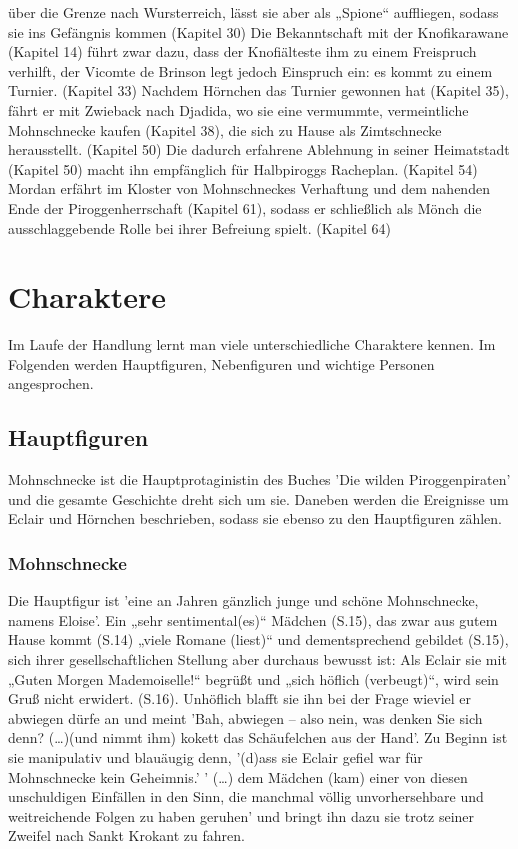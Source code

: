 über die Grenze nach Wursterreich, lässt sie aber als „Spione“ auffliegen, sodass sie ins Gefängnis kommen (Kapitel 30) 
Die Bekanntschaft mit der Knofikarawane (Kapitel 14) führt zwar dazu, dass der Knofiälteste ihm zu einem Freispruch 
verhilft, der Vicomte de Brinson legt jedoch Einspruch ein: es kommt zu einem Turnier. (Kapitel 33) 
Nachdem Hörnchen das Turnier gewonnen hat (Kapitel 35), fährt er mit Zwieback nach Djadida, wo sie eine vermummte, 
vermeintliche Mohnschnecke kaufen (Kapitel 38), die sich zu Hause als Zimtschnecke herausstellt. (Kapitel 50) 
Die dadurch erfahrene Ablehnung in seiner Heimatstadt (Kapitel 50) macht ihn empfänglich für Halbpiroggs 
Racheplan. (Kapitel 54) Mordan erfährt im Kloster von Mohnschneckes Verhaftung und dem nahenden Ende der 
Piroggenherrschaft (Kapitel 61), sodass er schließlich als Mönch die ausschlaggebende Rolle bei ihrer 
Befreiung spielt. (Kapitel 64)


\section{Charaktere}
Im Laufe der Handlung lernt man viele unterschiedliche Charaktere kennen. Im Folgenden werden Hauptfiguren,  Nebenfiguren und wichtige Personen angesprochen.

\subsection{Hauptfiguren}

Mohnschnecke ist die Hauptprotaginistin des Buches 'Die wilden Piroggenpiraten' und die gesamte Geschichte dreht sich um sie. Daneben werden die Ereignisse um Eclair und Hörnchen beschrieben, sodass sie ebenso zu den Hauptfiguren zählen.

\subsubsection{Mohnschnecke}

Die Hauptfigur ist 'eine an Jahren gänzlich junge und schöne Mohnschnecke, namens Eloise'. \cite[S.13]{pir}
Ein „sehr sentimental(es)“ Mädchen (S.15), das  zwar aus gutem Hause kommt (S.14) „viele Romane (liest)“ 
und dementsprechend gebildet (S.15), sich ihrer gesellschaftlichen Stellung aber durchaus bewusst ist: 
Als Eclair sie mit „Guten Morgen Mademoiselle!“ begrüßt und „sich höflich (verbeugt)“, wird sein Gruß nicht 
erwidert. (S.16). Unhöflich blafft sie ihn bei der Frage wieviel er abwiegen dürfe an
und meint 'Bah, abwiegen – also nein, was denken Sie sich denn? (…)(und nimmt ihm) kokett das Schäufelchen aus der Hand'. \cite[S.16]{pir}
Zu Beginn ist sie manipulativ und blauäugig denn, '(d)ass sie Eclair gefiel war für Mohnschnecke kein Geheimnis.'  \cite[S.17]{pir}
' (…) dem Mädchen (kam) einer von diesen unschuldigen Einfällen in den Sinn, die manchmal völlig unvorhersehbare und weitreichende Folgen zu haben geruhen' \cite[S. 19]{pir}
und bringt ihn dazu sie trotz seiner Zweifel nach Sankt Krokant zu fahren.  \cite[S. 19]{pir}

